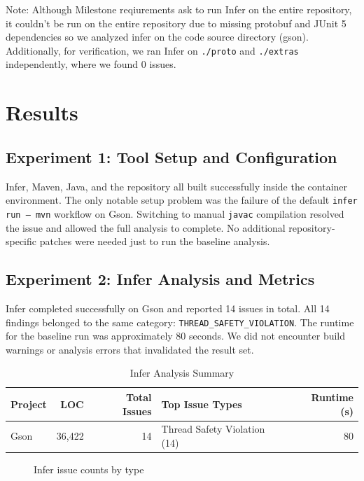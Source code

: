 \documentclass[11pt]{article}
\begin{document}
Note: Although Milestone reqiurements ask to run Infer on the entire repository, it couldn't be run on the entire repository due to missing protobuf and JUnit 5 dependencies so we analyzed infer on the code source directory (gson). Additionally, for verification, we ran Infer on \texttt{./proto} and \texttt{./extras} independently, where we found 0 issues.
\section{Results}

\subsection{Experiment 1: Tool Setup and Configuration}
Infer, Maven, Java, and the repository all built successfully inside the container environment. The only notable setup problem was the failure of the default \texttt{infer run -- mvn} workflow on Gson. Switching to manual \texttt{javac} compilation resolved the issue and allowed the full analysis to complete. No additional repository-specific patches were needed just to run the baseline analysis.

\subsection{Experiment 2: Infer Analysis and Metrics}
Infer completed successfully on Gson and reported 14 issues in total. All 14 findings belonged to the same category: \texttt{THREAD\_SAFETY\_VIOLATION}. The runtime for the baseline run was approximately 80 seconds. We did not encounter build warnings or analysis errors that invalidated the result set.

\begin{table}[H]
\centering
\caption{Infer Analysis Summary}
\begin{tabular}{lrrl r}
\toprule
Project & LOC & Total Issues & Top Issue Types & Runtime (s) \\
\midrule
Gson & 36,422 & 14 & Thread Safety Violation (14) & 80 \\
\bottomrule
\end{tabular}
\end{table}

\begin{figure}[H]
\centering
{}
\caption{Infer issue counts by type}
\end{figure}
\end{document}
